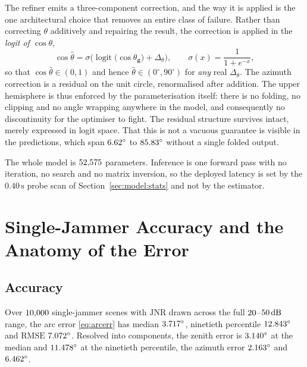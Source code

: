 \documentclass[journal]{IEEEtran}
\newcommand{\JNR}{\mathrm{JNR}}
\newcommand{\RMSE}{\mathrm{RMSE}}
\newcommand{\dB}{\,\mathrm{dB}}
\newcommand{\degs}{^\circ}
\begin{document}
The refiner emits a three-component correction, and the way it is applied is
the one architectural choice that removes an entire class of failure. Rather
than correcting $\theta$ additively and repairing the result, the correction
is applied in the \emph{logit of $\cos\theta$},
\begin{equation}
\cos\hat\theta
= \sigma\!\Big(
\operatorname{logit}\big(\cos\theta_{\mathbf{g}}\big) + \Delta_\theta
\Big),
\qquad
\sigma(x) = \frac{1}{1+e^{-x}},
\label{eq:thetalogit}
\end{equation}
so that $\cos\hat\theta \in (0,1)$ and hence
$\hat\theta \in (0\degs, 90\degs)$ for \emph{any} real $\Delta_\theta$. The
azimuth correction is a residual on the unit circle, renormalised after
addition. The upper hemisphere is thus enforced by the parameterisation
itself: there is no folding, no clipping and no angle wrapping anywhere in the
model, and consequently no discontinuity for the optimiser to fight. The
residual structure survives intact, merely expressed in logit space. That this
is not a vacuous guarantee is visible in the predictions, which span
$\thetaPredLo\degs$ to $\thetaPredHi\degs$ without a single folded output.

The whole model is $52{,}575$ parameters. Inference is one forward pass
with no iteration, no search and no matrix inversion, so the deployed latency
is set by the $0.40\,\mathrm{s}$ probe scan of Section~\ref{sec:model:stats}
and not by the estimator.

\section{Single-Jammer Accuracy and the Anatomy of the Error}
\label{sec:single}

\subsection{Accuracy}
\label{sec:single:acc}

Over $10{,}000$ single-jammer scenes with $\JNR$ drawn across the full
$20$--$\jnrHi\dB$ range, the arc error \eqref{eq:arcerr} has median
$\netArcPfifty\degs$, ninetieth percentile $\netArcPninety\degs$ and
$\RMSE$ $\netArcRmse\degs$. Resolved into components, the zenith error is
$\netZenPfifty\degs$ at the median and $\netZenPninety\degs$ at the ninetieth
percentile, the azimuth error $\netAziPfifty\degs$ and
$\netAziPninety\degs$.
\end{document}
